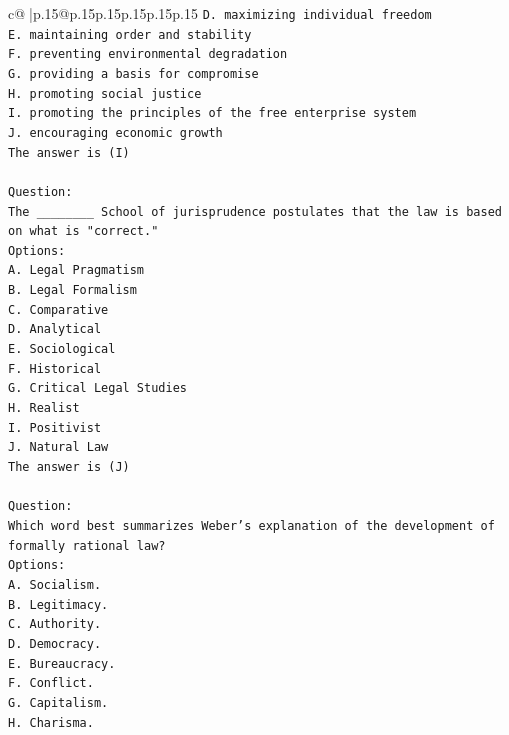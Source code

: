 \documentclass{article}
\begin{document}
{\begin{supertabular}{c@{$\;$}|p{.15\linewidth}@{}p{.15\linewidth}p{.15\linewidth}p{.15\linewidth}p{.15\linewidth}p{.15\linewidth}}
{{{\texttt{D. maximizing individual freedom} \\
\texttt{E. maintaining order and stability} \\
\texttt{F. preventing environmental degradation} \\
\texttt{G. providing a basis for compromise} \\
\texttt{H. promoting social justice} \\
\texttt{I. promoting the principles of the free enterprise system} \\
\texttt{J. encouraging economic growth} \\
\texttt{The answer is (I)} \\
\\ 
\texttt{Question:} \\
\texttt{The \_\_\_\_\_\_\_\_ School of jurisprudence postulates that the law is based on what is "correct."} \\
\texttt{Options:} \\
\texttt{A. Legal Pragmatism} \\
\texttt{B. Legal Formalism} \\
\texttt{C. Comparative} \\
\texttt{D. Analytical} \\
\texttt{E. Sociological} \\
\texttt{F. Historical} \\
\texttt{G. Critical Legal Studies} \\
\texttt{H. Realist} \\
\texttt{I. Positivist} \\
\texttt{J. Natural Law} \\
\texttt{The answer is (J)} \\
\\ 
\texttt{Question:} \\
\texttt{Which word best summarizes Weber's explanation of the development of formally rational law?} \\
\texttt{Options:} \\
\texttt{A. Socialism.} \\
\texttt{B. Legitimacy.} \\
\texttt{C. Authority.} \\
\texttt{D. Democracy.} \\
\texttt{E. Bureaucracy.} \\
\texttt{F. Conflict.} \\
\texttt{G. Capitalism.} \\
\texttt{H. Charisma.} \\
}}}
\end{supertabular}}
\end{document}

